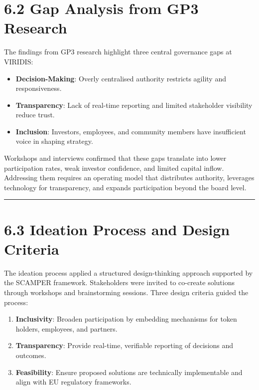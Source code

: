 \documentclass[
  english,
  12pt,
  oneside,
  open=any]{scrbook}
\providecommand{\tightlist}{%
  \setlength{\itemsep}{0pt}\setlength{\parskip}{0pt}}\usepackage{longtable,booktabs,array}
\begin{document}
\section{6.2 Gap Analysis from GP3 Research}\label{sec-gap-res}

The findings from GP3 research highlight three central governance gaps
at VIRIDIS:

\begin{itemize}
\tightlist
\item
  \textbf{Decision-Making}: Overly centralised authority restricts
  agility and responsiveness.\\
\item
  \textbf{Transparency}: Lack of real-time reporting and limited
  stakeholder visibility reduce trust.\\
\item
  \textbf{Inclusion}: Investors, employees, and community members have
  insufficient voice in shaping strategy.
\end{itemize}

Workshops and interviews confirmed that these gaps translate into lower
participation rates, weak investor confidence, and limited capital
inflow. Addressing them requires an operating model that distributes
authority, leverages technology for transparency, and expands
participation beyond the board level.

\begin{center}\rule{0.5\linewidth}{0.5pt}\end{center}

\section{6.3 Ideation Process and Design Criteria}\label{sec-ideation}

The ideation process applied a structured design-thinking approach
supported by the SCAMPER framework. Stakeholders were invited to
co-create solutions through workshops and brainstorming sessions. Three
design criteria guided the process:

\begin{enumerate}
\def\labelenumi{\arabic{enumi}.}
\tightlist
\item
  \textbf{Inclusivity}: Broaden participation by embedding mechanisms
  for token holders, employees, and partners.\\
\item
  \textbf{Transparency}: Provide real-time, verifiable reporting of
  decisions and outcomes.\\
\item
  \textbf{Feasibility}: Ensure proposed solutions are technically
  implementable and align with EU regulatory frameworks.
\end{enumerate}
\end{document}
